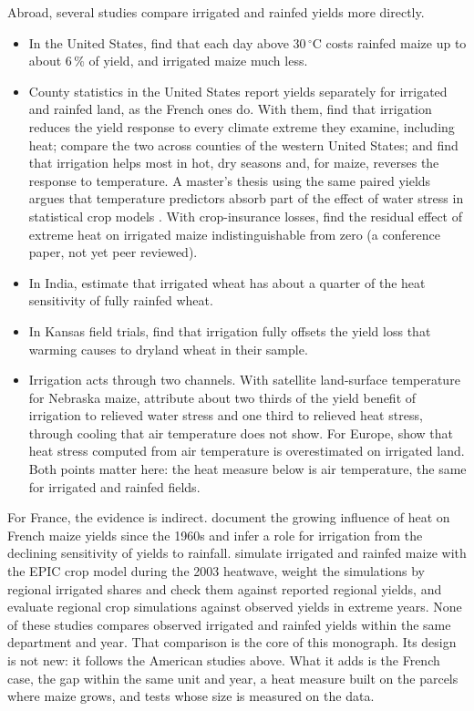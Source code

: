 Abroad, several studies compare irrigated and rainfed yields more directly.
\begin{itemize}
  \item In the United States, \textcite{schauberger2017} find that each day above 30\,$^{\circ}$C costs rainfed maize up to about 6\,\% of yield, and irrigated maize much less.
  \item County statistics in the United States report yields separately for irrigated and rainfed land, as the French ones do. With them, \textcite{troy2015} find that irrigation reduces the yield response to every climate extreme they examine, including heat; \textcite{li2018} compare the two across counties of the western United States; and \textcite{luan2021} find that irrigation helps most in hot, dry seasons and, for maize, reverses the response to temperature. A master's thesis using the same paired yields argues that temperature predictors absorb part of the effect of water stress in statistical crop models \parencite{hunter2026}. With crop-insurance losses, \textcite{pinto2026} find the residual effect of extreme heat on irrigated maize indistinguishable from zero (a conference paper, not yet peer reviewed).
  \item In India, \textcite{zaveri2019} estimate that irrigated wheat has about a quarter of the heat sensitivity of fully rainfed wheat.
  \item In Kansas field trials, \textcite{tack2017} find that irrigation fully offsets the yield loss that warming causes to dryland wheat in their sample.
  \item Irrigation acts through two channels. With satellite land-surface temperature for Nebraska maize, \textcite{zhu2022} attribute about two thirds of the yield benefit of irrigation to relieved water stress and one third to relieved heat stress, through cooling that air temperature does not show. For Europe, \textcite{siebert2017} show that heat stress computed from air temperature is overestimated on irrigated land. Both points matter here: the heat measure below is air temperature, the same for irrigated and rainfed fields.
\end{itemize}

For France, the evidence is indirect. \textcite{hawkins2013} document the growing influence of heat on French maize yields since the 1960s and infer a role for irrigation from the declining sensitivity of yields to rainfall. \textcite{vandervelde2010} simulate irrigated and rainfed maize with the EPIC crop model during the 2003 heatwave, weight the simulations by regional irrigated shares and check them against reported regional yields, and \textcite{vandervelde2012} evaluate regional crop simulations against observed yields in extreme years. None of these studies compares observed irrigated and rainfed yields within the same department and year. That comparison is the core of this monograph. Its design is not new: it follows the American studies above. What it adds is the French case, the gap within the same unit and year, a heat measure built on the parcels where maize grows, and tests whose size is measured on the data.

